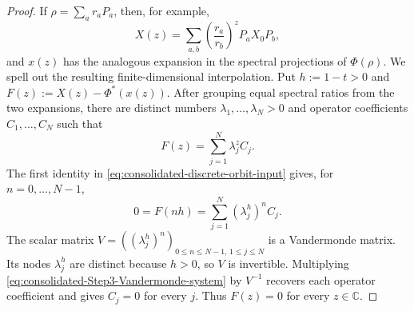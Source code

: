 \documentclass[11pt]{article}
\theoremstyle{remark}
\newcommand{\1}{\mathbbm{1}}
\begin{document}
\begin{proof}
If $\rho=\sum_a r_aP_a$, then, for example,
\begin{equation}
 X(z)=\sum_{a,b}\left(\frac{r_a}{r_b}\right)^zP_aX_0P_b,
 \label{eq:consolidated-orbit-spectral-expansion}
\end{equation}
and $x(z)$ has the analogous expansion in the spectral projections of
$\Phi(\rho)$.  We spell out the resulting finite-dimensional
interpolation.  Put $h:=1-t>0$ and
$F(z):=X(z)-\Phi^*(x(z))$.  After grouping equal spectral ratios from
the two expansions, there are distinct numbers
$\lambda_1,\ldots,\lambda_N>0$ and operator coefficients
$C_1,\ldots,C_N$ such that
\begin{equation}
 F(z)=\sum_{j=1}^N\lambda_j^z C_j.
 \label{eq:consolidated-Step3-exponential-sum}
\end{equation}
The first identity in
\eqref{eq:consolidated-discrete-orbit-input} gives, for
$n=0,\ldots,N-1$,
\begin{equation}
 0=F(nh)=\sum_{j=1}^N(\lambda_j^h)^n C_j.
 \label{eq:consolidated-Step3-Vandermonde-system}
\end{equation}
The scalar matrix
$V=((\lambda_j^h)^n)_{0\leq n\leq N-1,\,1\leq j\leq N}$ is a
Vandermonde matrix.  Its nodes $\lambda_j^h$ are distinct because
$h>0$, so $V$ is invertible.  Multiplying
\eqref{eq:consolidated-Step3-Vandermonde-system} by $V^{-1}$ recovers
each operator coefficient and gives $C_j=0$ for every $j$.  Thus
$F(z)=0$ for every $z\in\mathbb C$.


\end{proof}
\end{document}
